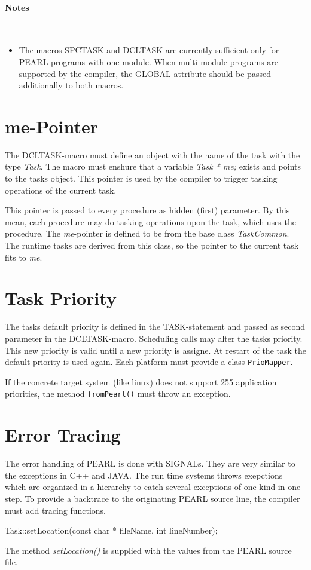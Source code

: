 \begin{description}
\paragraph{Notes}\ \\
\begin{itemize}
\item The macros SPCTASK and DCLTASK are currently sufficient only for
    PEARL programs with one module. When multi-module programs
    are supported by the compiler, the GLOBAL-attribute should be 
    passed additionally to both macros.
\end{itemize}

\section{me-Pointer}
The DCLTASK-macro must define an object with the name of the
task with the type {\em Task}.
The macro must enshure that a variable  {\em Task * me;} exists
and points to the tasks object. This pointer is used
by the compiler to trigger tasking operations of the current
task.

This pointer is passed to every procedure as hidden (first) parameter.
By this mean, each procedure may do tasking operations upon the
task, which uses the procedure.
The {\em me}-pointer is defined to be from the base class  {\em TaskCommon}. 
The runtime tasks are derived from this class, so the pointer to the current 
task fits to {\em me}.

\section{Task Priority}
The tasks default priority is defined in the TASK-statement and passed
as second parameter in the DCLTASK-macro.
Scheduling calls may alter the tasks priority. This new priority is valid 
until a new priority is assigne. At restart of the task the default 
priority is used again. Each platform must provide a class \verb|PrioMapper|.

If the concrete target system (like linux) does not support 255 
 application priorities, the method \verb|fromPearl()| must throw
an exception.


\section{Error Tracing}
The error handling of PEARL is done with SIGNALs.
They are very similar to the exceptions in C++ and JAVA. 
The run time systems throws exepctions which are organized in a
hierarchy to catch several exceptions of one kind in one step.
To provide a backtrace to the originating PEARL source line, the compiler 
must add tracing functions.
\begin{CppCode}
Task::setLocation(const char * fileName, int lineNumber);
\end{CppCode}
The method {\em setLocation()} is supplied with the values from
the PEARL source file.


\end{description}
